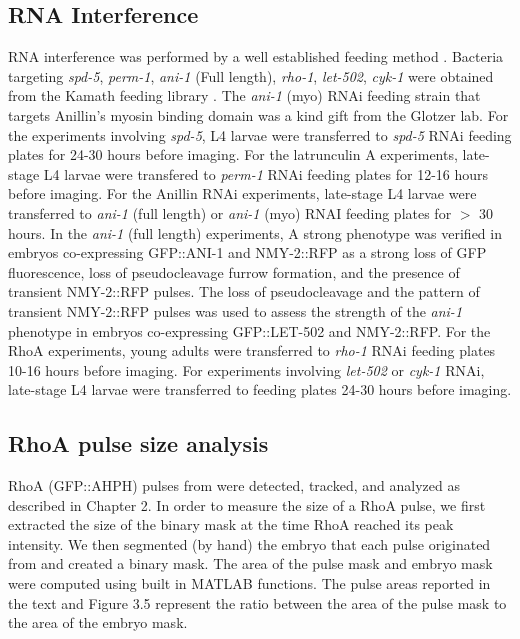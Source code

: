 \documentclass{ucetd}
\begin{document}
\subsection{RNA Interference}
RNA interference was performed by a well established feeding method \cite{Timmons:2001wg}.  Bacteria targeting \textit{spd-5}, \textit{perm-1}, \textit{ani-1} (Full length), \textit{rho-1}, \textit{let-502}, \textit{cyk-1} were obtained from the Kamath feeding library \cite{Kamath:2003bk}.  The \textit{ani-1} (myo) RNAi feeding strain that targets Anillin's myosin binding domain was a kind gift from the Glotzer lab.  For the experiments involving \textit{spd-5}, L4 larvae were transferred to \textit{spd-5} RNAi feeding plates for 24-30 hours before imaging.  For the latrunculin A experiments, late-stage L4 larvae were transfered to \textit{perm-1} RNAi feeding plates for 12-16 hours before imaging.  For the Anillin RNAi experiments, late-stage L4 larvae were transferred to \textit{ani-1} (full length) or \textit{ani-1} (myo) RNAI feeding plates for \(>\)  30 hours.  In the \textit{ani-1} (full length) experiments, A strong phenotype was verified in embryos co-expressing GFP::ANI-1 and NMY-2::RFP as a strong loss of GFP fluorescence, loss of pseudocleavage furrow formation, and the presence of transient NMY-2::RFP pulses.  The loss of pseudocleavage and the pattern of transient NMY-2::RFP pulses was used to assess the strength of the \textit{ani-1} phenotype in embryos co-expressing GFP::LET-502 and NMY-2::RFP.  For the RhoA experiments, young adults were transferred to \textit{rho-1} RNAi feeding plates 10-16 hours before imaging.  For experiments involving \textit{let-502} or \textit{cyk-1} RNAi, late-stage L4 larvae were transferred to feeding plates 24-30 hours before imaging.

\subsection{RhoA pulse size analysis}

RhoA (GFP::AHPH) pulses from  were detected, tracked, and analyzed as described in Chapter 2.  In order to measure the size of a RhoA pulse, we first extracted the size of the binary mask at the time RhoA reached its peak intensity.  We then segmented (by hand) the embryo that each pulse originated from and created a binary mask.  The area of the pulse mask and embryo mask were computed using built in MATLAB functions.  The pulse areas reported in the text and Figure 3.5 represent the ratio between the area of the pulse mask to the area of the embryo mask.
\end{document}
